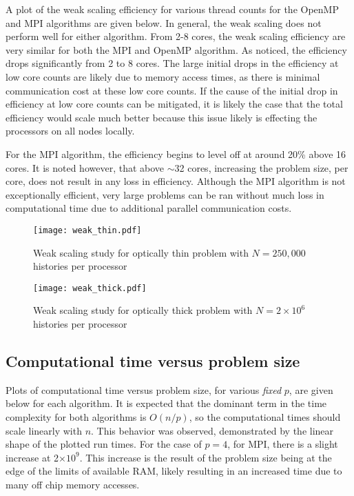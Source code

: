 \documentclass[12pt]{article}
\begin{document}
{{{A plot of the weak scaling efficiency for various thread counts for the OpenMP and
MPI algorithms are given below.  In general, the weak scaling does not perform well for either
algorithm.  From 2-8 cores, the weak scaling efficiency are very similar for both the
MPI and OpenMP algorithm.  As noticed, the efficiency drops significantly from 2 to 8 cores.   The large initial
drops in the efficiency at low core counts are likely due to memory access times, as
there is minimal communication cost at these low core counts.   If the cause of the initial drop in efficiency at low core counts can be mitigated, it is likely the case that the total
efficiency would scale much better because this issue likely is effecting the
processors on all nodes locally.

For the MPI algorithm, the efficiency begins to level off at around 20\% above 16 cores.  It is noted however,
that above $\sim$32 cores, increasing the problem size, per core, does not result
in any loss in efficiency.  Although the MPI algorithm is not exceptionally
efficient, very large problems can be ran without much loss in computational time due
to additional parallel communication costs.

     \begin{figure}[htbp!]
         \centering
           \texttt{[image: weak\_thin.pdf]}
           \caption{Weak scaling study for optically thin problem with $N=250,000$ histories per processor
           \label{weak1}}
     \end{figure}
     \begin{figure}[htbp!]
         \centering
           \texttt{[image: weak\_thick.pdf]}
           \caption{Weak scaling study for optically thick problem with
               $N=2\times 10^6$ histories per processor
           \label{weak2}}
     \end{figure}
\clearpage
\subsection{Computational time versus problem size}

Plots of computational time versus problem size, for various \emph{fixed} $p$, are
given below for each algorithm.  It is expected that the dominant term in the
time complexity for both algorithms is $O(n/p)$, so the computational times should scale linearly with $n$.
This behavior was observed, demonstrated by the linear shape of the plotted run times.
For the case of $p=4$, for MPI, there is a slight
increase at 2$\times 10^9$. This increase is the result of the problem size being at the edge of the limits
of available RAM, likely resulting in an increased time due to many off chip memory
accesses.   

}}}
\end{document}

